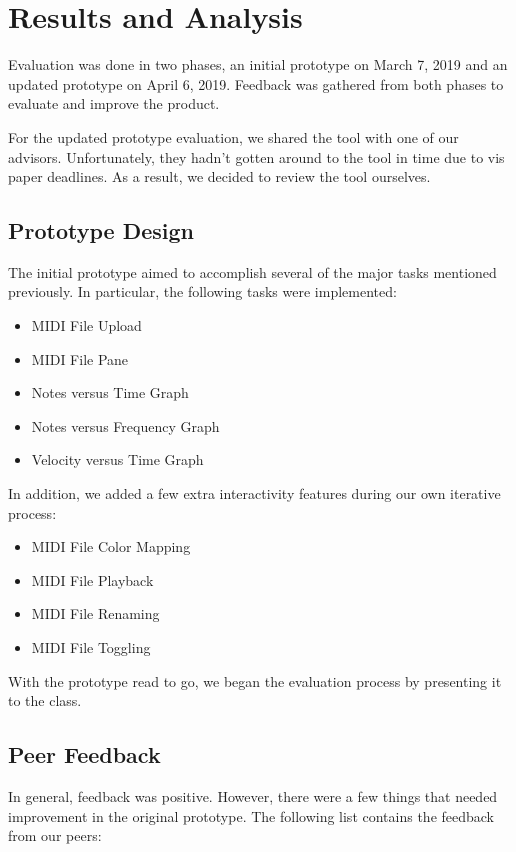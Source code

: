\documentclass[journal]{vgtc}                %
\begin{document}
\section{Results and Analysis}

Evaluation was done in two phases, an initial prototype on March 7, 2019 and an
updated prototype on April 6, 2019. Feedback was gathered from both phases to
evaluate and improve the product.

For the updated prototype evaluation, we shared the tool with one of our advisors.
Unfortunately, they hadn’t gotten around to the tool in time due to vis paper
deadlines. As a result, we decided to review the tool ourselves.

\subsection{Prototype Design}

The initial prototype aimed to accomplish several of the major tasks mentioned
previously. In particular, the following tasks were implemented:

\begin{itemize}
  \item MIDI File Upload
  \item MIDI File Pane
  \item Notes versus Time Graph
  \item Notes versus Frequency Graph
  \item Velocity versus Time Graph
\end{itemize}

In addition, we added a few extra interactivity features during our own
iterative process:

\begin{itemize}
  \item MIDI File Color Mapping
  \item MIDI File Playback
  \item MIDI File Renaming
  \item MIDI File Toggling
\end{itemize}

With the prototype read to go, we began the evaluation process by presenting
it to the class.

\subsection{Peer Feedback}

In general, feedback was positive. However, there were a few things
that needed improvement in the original prototype. The following
list contains the feedback from our peers:
\end{document}

